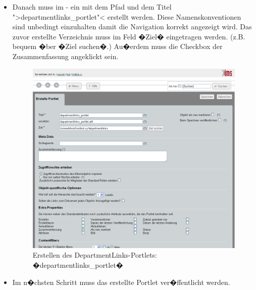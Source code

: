 \begin{itemize}
\item {Danach muss im - ein  mit dem Pfad  und dem Titel ">departmentlinks\_portlet"< erstellt werden. Diese Namenskonventionen sind unbedingt einzuhalten damit die Navigation korrekt angezeigt wird. Das zuvor erstellte Verzeichnis  muss im Feld �Ziel� eingetragen werden. (z.B. bequem �ber �Ziel suchen�.) Au�erdem muss die Checkbox der Zusammenfassung angeklickt sein.}


\begin{figure}[!ht]
  \centering
  \includegraphics[width=\textwidth]{./images/create-departmentlinksportlet.png}
  \caption{Erstellen des DepartmentLinks-Portlets:
    �departmentlinks\_portlet�}
  \label{fig:createdeplinkportlet}
\end{figure}

\item {Im n�chsten Schritt muss das erstellte Portlet ver�ffentlicht werden.}


\end{itemize}
